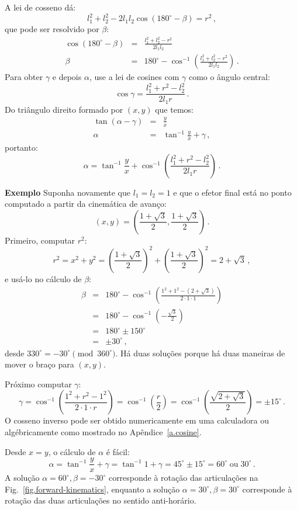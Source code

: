A lei de cosseno dá:
\[
l_1^2 + l_2^2 - 2l_1 l_2 \cos(180^\circ-\beta) = r^2\,,
\]
que pode ser resolvido por $\beta$:
\begin{eqnarray*}
\cos(180^\circ-\beta) &=& \frac{l_1^2 + l_2^2 - r^2}{2l_1 l_2}\\
\beta &=& 180^\circ-\cos^{-1}\left(\frac{l_1^2 + l_2^2 - r^2}{2l_1 l_2}\right)\,.
\end{eqnarray*}
Para obter $\gamma$ e depois $\alpha$, use a lei de cosines com $\gamma$ como o ângulo central:
\[
\cos\gamma = \frac{l_1^2 +r^2 - l_2^2}{2l_1 r}\,.
\]
Do triângulo direito formado por $(x,y)$ que temos:
\begin{eqnarray*}
\tan(\alpha - \gamma) &=& \frac{y}{x}\\
\alpha &=& \tan^{-1} \frac{y}{x} + \gamma\,,
\end{eqnarray*}
portanto:
\[
\alpha = \tan^{-1} \frac{y}{x} + \cos^{-1}\left(\frac{l_1^2 +r^2 - l_2^2}{2l_1 r}\right)\,.
\]

\noindent\textbf{Exemplo} Suponha novamente que $l_1 = l_2 = 1$ e que o efetor final está no ponto computado a partir da cinemática de avanço:
\[
(x,y) = \left(\frac{1+\sqrt{3}}{2},\frac{1+\sqrt{3}}{2}\right)\,.
\]
Primeiro, computar $r^2$:
\[
r^2 = x^2+y^2 = \left( \frac{1+\sqrt{3}}{2}\right)^2 + \left( \frac{1+\sqrt{3}}{2}\right)^2 = 2+\sqrt{3}\,,
\]
e usá-lo no cálculo de $\beta$:
\begin{eqnarray*}
\beta &=& 180^{\circ} - \cos^{-1} \left(\frac{1^2 + 1^2 - (2+\sqrt{3})}{2\cdot 1\cdot 1}\right)\\
&=& 180^{\circ} - \cos^{-1}\left(-\frac{\sqrt{3}}{2}\right)\\
&=& 180^{\circ} \pm 150^{\circ}\\
&=& \pm 30^{\circ}\,,
\end{eqnarray*}
desde $330^{\circ}=-30^{\circ} \!\!\!\pmod{360^\circ}$. Há duas soluções porque há duas maneiras de mover o braço para $(x,y)$.

Próximo computar $\gamma$:
\begin{equation}
\gamma = \cos^{-1}\left(\frac{1^2 + r^2 - 1^2}{2\cdot 1 \cdot r}\right) = \cos^{-1}\left(\frac{r}{2}\right)= \cos^{-1}\left(\frac{\sqrt{2+\sqrt{3}}}{2}\right) = \pm 15^{\circ}\,.\label{eq.cos15}
\end{equation}
O cosseno inverso pode ser obtido numericamente em uma calculadora ou algébricamente como mostrado no Apêndice~\ref{a.cosine}.

Desde $x=y$, o cálculo de $\alpha$ é fácil:
\[
\alpha = \tan^{-1}\frac{y}{x} + \gamma = 
\tan^{-1}1 + \gamma = 45^{\circ} \pm 15^{\circ} = 
60^{\circ} \;\textrm{ou}\; 30^{\circ}\,.
\]
A solução $\alpha=60^{\circ},\beta=-30^{\circ}$ corresponde à rotação das articulações na Fig.~\ref{fig.forward-kinematics}, enquanto a solução $\alpha=30^{\circ},\beta=30^{\circ}$ corresponde à rotação das duas articulações no sentido anti-horário.

